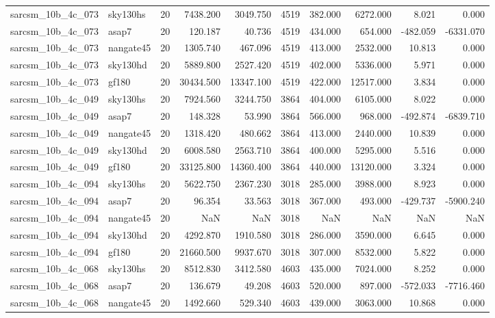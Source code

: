 \begin{tabular}{llrrrrrrrr}
sarcsm\_10b\_4c\_073 & sky130hs & 20 & 7438.200 & 3049.750 & 4519 & 382.000 & 6272.000 & 8.021 & 0.000 \\
sarcsm\_10b\_4c\_073 & asap7 & 20 & 120.187 & 40.736 & 4519 & 434.000 & 654.000 & -482.059 & -6331.070 \\
sarcsm\_10b\_4c\_073 & nangate45 & 20 & 1305.740 & 467.096 & 4519 & 413.000 & 2532.000 & 10.813 & 0.000 \\
sarcsm\_10b\_4c\_073 & sky130hd & 20 & 5889.800 & 2527.420 & 4519 & 402.000 & 5336.000 & 5.971 & 0.000 \\
sarcsm\_10b\_4c\_073 & gf180 & 20 & 30434.500 & 13347.100 & 4519 & 422.000 & 12517.000 & 3.834 & 0.000 \\
sarcsm\_10b\_4c\_049 & sky130hs & 20 & 7924.560 & 3244.750 & 3864 & 404.000 & 6105.000 & 8.022 & 0.000 \\
sarcsm\_10b\_4c\_049 & asap7 & 20 & 148.328 & 53.990 & 3864 & 566.000 & 968.000 & -492.874 & -6839.710 \\
sarcsm\_10b\_4c\_049 & nangate45 & 20 & 1318.420 & 480.662 & 3864 & 413.000 & 2440.000 & 10.839 & 0.000 \\
sarcsm\_10b\_4c\_049 & sky130hd & 20 & 6008.580 & 2563.710 & 3864 & 400.000 & 5295.000 & 5.516 & 0.000 \\
sarcsm\_10b\_4c\_049 & gf180 & 20 & 33125.800 & 14360.400 & 3864 & 440.000 & 13120.000 & 3.324 & 0.000 \\
sarcsm\_10b\_4c\_094 & sky130hs & 20 & 5622.750 & 2367.230 & 3018 & 285.000 & 3988.000 & 8.923 & 0.000 \\
sarcsm\_10b\_4c\_094 & asap7 & 20 & 96.354 & 33.563 & 3018 & 367.000 & 493.000 & -429.737 & -5900.240 \\
sarcsm\_10b\_4c\_094 & nangate45 & 20 & NaN & NaN & 3018 & NaN & NaN & NaN & NaN \\
sarcsm\_10b\_4c\_094 & sky130hd & 20 & 4292.870 & 1910.580 & 3018 & 286.000 & 3590.000 & 6.645 & 0.000 \\
sarcsm\_10b\_4c\_094 & gf180 & 20 & 21660.500 & 9937.670 & 3018 & 307.000 & 8532.000 & 5.822 & 0.000 \\
sarcsm\_10b\_4c\_068 & sky130hs & 20 & 8512.830 & 3412.580 & 4603 & 435.000 & 7024.000 & 8.252 & 0.000 \\
sarcsm\_10b\_4c\_068 & asap7 & 20 & 136.679 & 49.208 & 4603 & 520.000 & 897.000 & -572.033 & -7716.460 \\
sarcsm\_10b\_4c\_068 & nangate45 & 20 & 1492.660 & 529.340 & 4603 & 439.000 & 3063.000 & 10.868 & 0.000 \\

\end{tabular}
